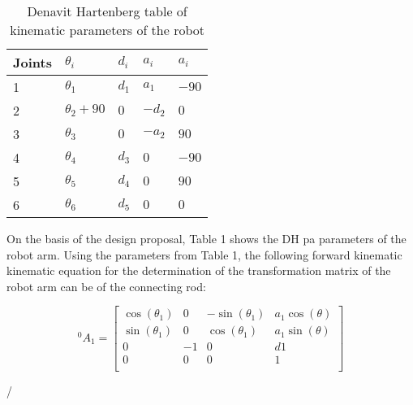 \begin{table}[H]
	\caption{Denavit Hartenberg table of kinematic parameters of the robot}\label{tab:DH}
	\centering
	\setlength{\tabcolsep}{18pt}
	\begin{tabular}{lllll}
	\hline 
	Joints & $\theta_i$ 	& $d_i$ & $a_i$ & $a_i$ \\ \hline
	1      & $\theta_1$ 	& $d_1$ & $a_1$ & $-90 $ \\
	2      & $\theta_2+90$  & $0  $ & $-d_2$ & $0   $ \\
	3      & $\theta_3$ 	& $0  $ & $-a_2  $ & $90  $ \\
	4      & $\theta_4$ 	& $d_3$ & $0  $ & $-90  $ \\
	5      & $\theta_5$ 	& $d_4$ & $0  $ & $90  $ \\
	6      & $\theta_6$ 	& $d_5$ & $0  $ & $0   $ \\ \hline
	\end{tabular}

	\end{table}


	On the basis of the design proposal, Table 1 shows the DH pa
parameters of the robot arm. \citep{siciliano2010robotics}
Using the parameters from Table 1, the following forward kinematic
kinematic equation for the determination of the transformation matrix of the robot arm can be
of the connecting rod:

\[
	{}^{0}_{}A_1 = \begin{bmatrix}
	\cos(\theta_1)& 0& -\sin(\theta_1)  & a_1\cos(\theta) \\
	\sin(\theta_1)& 0 & \cos(\theta_1) & a_1\sin(\theta) \\
	0 & -1 & 0 & d1 \\
	0 & 0 & 0 & 1 \\
\end{bmatrix}
\]

/
